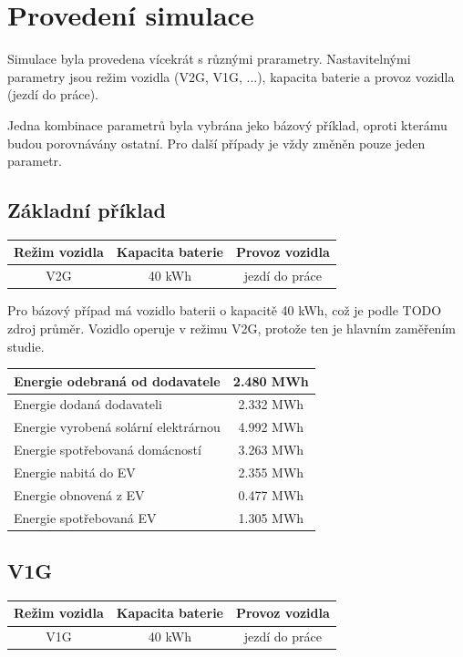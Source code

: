 \documentclass[12pt,a4paper]{article}
\begin{document}
\section{Provedení simulace}

Simulace byla provedena vícekrát s různými prarametry.
Nastavitelnými parametry jsou režim vozidla (V2G, V1G, ...), kapacita baterie a provoz vozidla (jezdí do práce).

Jedna kombinace parametrů byla vybrána jeko bázový příklad,
oproti kterámu budou porovnávány ostatní.
Pro další případy je vždy změněn pouze jeden parametr.

\subsection{Základní příklad}

\bigskip
\begin{tabular}{ | c | c | c | }
\hline
Režim vozidla & Kapacita baterie & Provoz vozidla \\
\hline
V2G & 40 kWh & jezdí do práce \\
\hline
\end{tabular}
\bigskip

Pro bázový případ má vozidlo baterii o kapacitě 40 kWh, což je podle TODO zdroj průměr.
Vozidlo operuje v režimu V2G, protože ten je hlavním zaměřením studie.

\bigskip
\begin{tabular}{ | l | c | }
\hline
Energie odebraná od dodavatele & 2.480 MWh \\
\hline
Energie dodaná dodavateli & 2.332 MWh \\
\hline
Energie vyrobená solární elektrárnou & 4.992 MWh \\
\hline
Energie spotřebovaná domácností & 3.263 MWh \\
\hline
Energie nabitá do EV & 2.355 MWh \\
\hline
Energie obnovená z EV & 0.477 MWh \\
\hline
Energie spotřebovaná EV & 1.305 MWh \\
\hline
\end{tabular}
\bigskip


\subsection{V1G}

\bigskip
\begin{tabular}{ | c | c | c | }
\hline
Režim vozidla & Kapacita baterie & Provoz vozidla \\
\hline
V1G & 40 kWh & jezdí do práce \\
\hline
\end{tabular}
\bigskip
\end{document}
